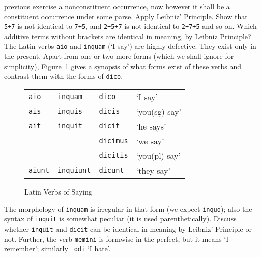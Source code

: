 previous exercise a nonconstituent occurrence, now however it shall
be a constituent occurrence under some parse. Apply Leibniz'
Principle. Show that {\tt 5+7} is not identical to {\tt 7+5},
and {\tt 2+5+7} is not identical to {\tt 2+7+5} and so on. 
Which additive terms without brackets are identical 
in meaning, by Leibniz Principle?
\vplatz
\exercise
The Latin verbs {\tt aio} and  {\tt inquam} (`I say') are highly
defective. They exist only in the present. Apart from one or two more
forms (which we shall ignore for simplicity), Figure~\ref{fig:aio}
gives a synopsis of what forms exist of these verbs and contrast 
them with the forms of {\tt dico}.
\begin{figure}
\begin{center}
\begin{tabular}{|l|l|l||l|}
\hline
{\tt aio} & {\tt inquam} & {\tt dico} & `I say' \\
{\tt ais} & {\tt inquis} & {\tt dicis} & `you(sg) say' \\
{\tt ait} & {\tt inquit} & {\tt dicit} & `he says' \\
          &              & {\tt dicimus} & `we say' \\
          &              & {\tt dicitis} & `you(pl) say' \\
{\tt aiunt} & {\tt inquiunt} & {\tt dicunt} & `they say' \\\hline
\end{tabular}
\end{center}
\caption{Latin Verbs of Saying}
\label{fig:aio}
\end{figure}
The morphology of {\tt inquam} is irregular in that form (we 
expect {\tt inquo}); also the syntax of {\tt inquit} is
somewhat peculiar (it is used parenthetically).  Discuss whether
{\tt inquit} and {\tt dicit} can be identical in meaning by
Leibniz' Principle or not. Further, the verb {\tt memini} is
formwise in the perfect, but it means `I remember'; similarly {\tt
odi} `I hate'.
